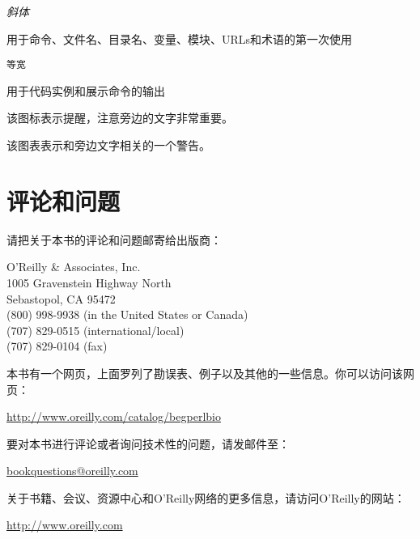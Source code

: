 \textit{斜体}
\begin{adjustwidth}{1cm}{0cm}
用于命令、文件名、目录名、变量、模块、URLs和术语的第一次使用
\end{adjustwidth}

\texttt{等宽}
\begin{adjustwidth}{1cm}{0cm}
用于代码实例和展示命令的输出
\end{adjustwidth}

\begin{adjustwidth}{2cm}{2cm}
\noindent
该图标表示提醒，注意旁边的文字非常重要。
\end{adjustwidth}

\vspace*{\baselineskip}

\begin{adjustwidth}{2cm}{2cm}
\noindent
该图表表示和旁边文字相关的一个警告。
\end{adjustwidth}

\section*{评论和问题}
请把关于本书的评论和问题邮寄给出版商：

O'Reilly \& Associates, Inc.\\
1005 Gravenstein Highway North\\
Sebastopol, CA 95472\\
(800) 998-9938 (in the United States or Canada)\\
(707) 829-0515 (international/local)\\
(707) 829-0104 (fax)

本书有一个网页，上面罗列了勘误表、例子以及其他的一些信息。你可以访问该网页：

\href{http://www.oreilly.com/catalog/begperlbio}{http://www.oreilly.com/catalog/begperlbio}

要对本书进行评论或者询问技术性的问题，请发邮件至：

\href{bookquestions@oreilly.com}{bookquestions@oreilly.com}

关于书籍、会议、资源中心和O'Reilly网络的更多信息，请访问O'Reilly的网站：

\href{http://www.oreilly.com}{http://www.oreilly.com}

